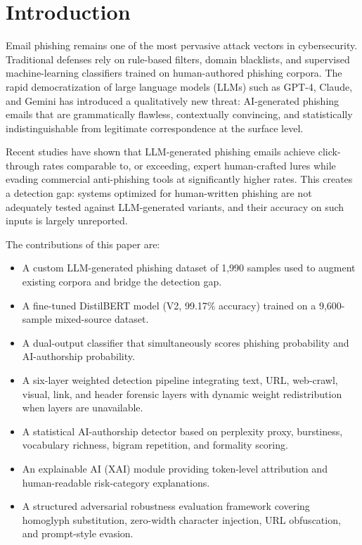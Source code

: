 \documentclass[pdflatex,sn-mathphys-num]{sn-jnl}
\begin{document}
\section{Introduction}\label{sec1}

Email phishing remains one of the most pervasive attack vectors in cybersecurity. Traditional defenses rely on rule-based filters, domain blacklists, and supervised machine-learning classifiers trained on human-authored phishing corpora. The rapid democratization of large language models (LLMs) such as GPT-4, Claude, and Gemini has introduced a qualitatively new threat: AI-generated phishing emails that are grammatically flawless, contextually convincing, and statistically indistinguishable from legitimate correspondence at the surface level.

Recent studies have shown that LLM-generated phishing emails achieve click-through rates comparable to, or exceeding, expert human-crafted lures while evading commercial anti-phishing tools at significantly higher rates. This creates a detection gap: systems optimized for human-written phishing are not adequately tested against LLM-generated variants, and their accuracy on such inputs is largely unreported.

The contributions of this paper are:
\begin{itemize}
    \item A custom LLM-generated phishing dataset of 1,990 samples used to augment existing corpora and bridge the detection gap.
    \item A fine-tuned DistilBERT model (V2, 99.17\% accuracy) trained on a 9,600-sample mixed-source dataset.
    \item A dual-output classifier that simultaneously scores phishing probability and AI-authorship probability.
    \item A six-layer weighted detection pipeline integrating text, URL, web-crawl, visual, link, and header forensic layers with dynamic weight redistribution when layers are unavailable.
    \item A statistical AI-authorship detector based on perplexity proxy, burstiness, vocabulary richness, bigram repetition, and formality scoring.
    \item An explainable AI (XAI) module providing token-level attribution and human-readable risk-category explanations.
    \item A structured adversarial robustness evaluation framework covering homoglyph substitution, zero-width character injection, URL obfuscation, and prompt-style evasion.
\end{itemize}
\end{document}
